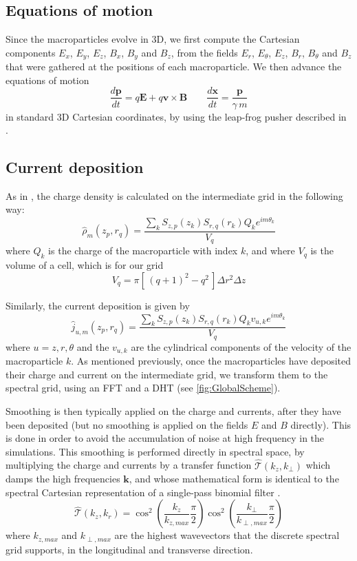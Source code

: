\documentclass[1p,times,authoryear]{elsarticle}
\renewcommand{\vec}[1]{\boldsymbol{#1}}
\newcommand{\spectral}[1]{\hat{\mathcal{#1}}}
\begin{document}
\subsection{Equations of motion}
\label{sec:eq-motion}

Since the macroparticles evolve in 3D, we first compute
the Cartesian components $E_x$, $E_y$, $E_z$, $B_x$, $B_y$ and
$B_z$, from the fields $E_r$, $E_\theta$, $E_z$, $B_r$, $B_\theta$ and
$B_z$ that were gathered at the positions of each macroparticle. 
We then advance the equations of motion
\[ \frac{d\vec{p}}{dt} = q\vec{E} + q\vec{v}\times \vec{B} \qquad
\frac{d\vec{x}}{dt} = \frac{\vec{p}}{\gamma \,m} \]
\noindent  in standard 3D Cartesian coordinates, by using the leap-frog pusher described in \citep{VayPoP2008}.

\subsection{Current deposition}
\label{sec:current-deposition}

As in \citep{Lifschitz}, the charge density is calculated on the intermediate grid in the
following way:
\[ \hat{\rho}_m(z_p,r_q) = \frac{ \sum_k  S_{z,p}(z_k)S_{r,q}(r_k) Q_k e^{im\theta_k}}{V_{q}} \]
where $Q_k$ is the charge of the macroparticle with index $k$, and
where $V_q$ is the volume of a cell, which is for our grid
\[ V_{q} = \pi [\, (q+1)^2- q^2\,] \Delta r^2 \Delta z \]

\noindent Similarly, the current deposition is given by
\[ \hat{j}_{u,m}(z_p,r_q) = \frac{\sum_k S_{z,p}(z_k) S_{r,q}(r_k)
Q_k v_{u,k} e^{im\theta_k}}{V_{q}} \]
where $u = z,r,\theta$ and the $v_{u,k}$ are the cylindrical components of the
velocity of the macroparticle $k$. As mentioned previously, once the
macroparticles have deposited their charge and current on the
intermediate grid, we transform them to the spectral grid, using an
FFT and a DHT (see \cref{fig:GlobalScheme}).

Smoothing is then typically applied on the charge and currents, after they
have been deposited (but no smoothing is applied on the
fields $E$ and $B$ directly). This is done in order to avoid the accumulation
of noise at high frequency in the simulations. This smoothing
is performed directly in spectral space, by multiplying the charge
and currents by a transfer function $\spectral{T}(k_z, k_\perp)$ which
damps the high frequencies $\vec{k}$, and whose mathematical form is
identical to the spectral Cartesian representation of a single-pass
binomial filter \citep{Birdsall2004}.
\[ \spectral{T}(k_z, k_r) = \cos^2 \left( \frac{k_z}{k_{z,max}}\frac{\pi}{2} \right)
\cos^2\left( \frac{k_\perp}{k_{\perp,max}}\frac{\pi}{2} \right) \]
\noindent where $k_{z, max}$ and $k_{\perp,max}$ are the highest
wavevectors that the discrete spectral grid supports, in the
longitudinal and transverse direction.
\end{document}
